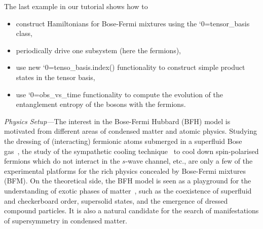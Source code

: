 \documentclass{SciPost}
\newcommand\0{\scalebox{-1}[1]{0}}
\let\svttfamily\ttfamily
\renewcommand\ttfamily{\svttfamily\catcode`0=\active }
\renewcommand\texttt{\bgroup\ttfamily\texttthelp}
\def\texttthelp#1{#1\egroup}
\begin{document}
The last example in our tutorial shows how to
\begin{itemize}
	\item construct Hamiltonians for Bose-Fermi mixtures using the \texttt{tensor\_basis} class,
	\item periodically drive one subsystem (here the fermions),
	\item use new \texttt{tenso\_basis.index()} functionality to construct simple product states in the tensor basis,
	\item use \texttt{obs\_vs\_time} functionality to compute the evolution of the entanglement entropy of the bosons with the fermions.
\end{itemize}

\noindent\emph{Physics Setup---}The interest in the Bose-Fermi Hubbard (BFH) model is motivated from different areas of condensed matter and atomic physics. Studying the dressing of (interacting) fermionic atoms submerged in a superfluid Bose gas~\cite{grusdt_15}, the study of the sympathetic cooling technique~\cite{ketterle_08} to cool down spin-polarised fermions which do not interact in the $s$-wave channel, etc., are only a few of the experimental platforms for the rich physics concealed by Bose-Fermi mixtures (BFM). On the theoretical side, the BFH model is seen as a playground for the understanding of exotic phases of matter~\cite{stasyuk_15,bilitewski_15,scaramazza_16,bukov_14_BFM}, such as the coexistence of superfluid and checkerboard order, supersolid states, and the emergence of dressed compound particles. It is also a natural candidate for the search of manifestations of supersymmetry in condensed matter.
\end{document}
